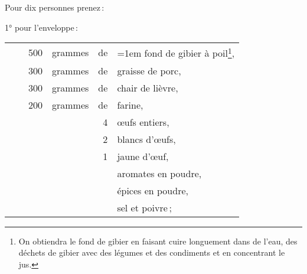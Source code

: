 Pour dix personnes prenez :

\bigskip

1° pour l'enveloppe :

\footnotesize
\begin{longtable}{rrrrrp{18em}}
  & \hspace{2em} & 500 & grammes & de & \hangindent=1em  fond de gibier à poil\footnote{On obtiendra
                                        le fond de gibier en faisant cuire longuement dans de l'eau,
                                        des déchets de gibier avec des légumes et des condiments et
                                        en concentrant le jus.},                                          \\
  & \hspace{2em} & 300 & grammes & de & graisse de porc,                                                  \\
  & \hspace{2em} & 300 & grammes & de & chair de lièvre,                                                  \\
  & \hspace{2em} & 200 & grammes & de & farine,                                                           \\
  & \hspace{2em} &     &         &  4 & œufs entiers,                                                     \\
  & \hspace{2em} &     &         &  2 & blancs d'œufs,                                                    \\
  & \hspace{2em} &     &         &  1 & jaune d'œuf,                                                      \\
  & \hspace{2em} &     &         &    & aromates en poudre,                                               \\
  & \hspace{2em} &     &         &    & épices en poudre,                                                 \\
  & \hspace{2em} &     &         &    & sel et poivre ;                                                   \\
\end{longtable}
\normalsize

